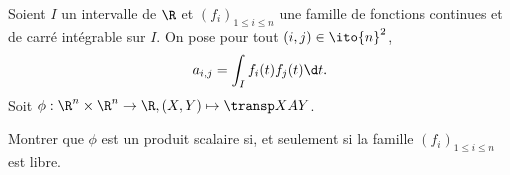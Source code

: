 \begin{enonce}
\begin{exercise}[ID={RMS127 E703},subtitle={Mines-Ponts PSI 2016},tags={mpsi},difficulty={}]
  Soient $I$ un intervalle de $\R$ et $\left( f_i \right)_{1\leq i\leq n}$ une famille de fonctions continues et de carré intégrable sur $I$.
  On pose pour tout $(i,j)\in\ito{n}^2$,
  \begin{equation*}
    a_{i,j} = \int_I f_i(t) f_j(t) \d t.
  \end{equation*}
  Soit $\phi:\R^n\times\R^n \to \R, (X,Y)\mapsto \transp X A Y$.

  Montrer que $\phi$ est un produit scalaire si, et seulement si la famille $\left( f_i \right)_{1\leq i\leq n}$ est libre.
\end{exercise}
\begin{solution}
\end{solution}
\end{enonce}
